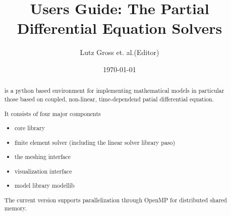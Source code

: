 \documentclass{manual}
\title{\esys Users Guide: The Partial Differential Equation Solvers}
\author{Lutz Gross et. al.(Editor)}
\date{\today}
\begin{document}
\maketitle



\begin{abstract}
\escript is a python based environment for implementing mathematical models in particular those based on coupled, non-linear, time-dependend patial differential equation.

It consists of four major components
\begin{itemize}
\item \escript core library
\item finite element solver \finley (including the linear solver library paso)
\item the meshing interface \pycad
\item visualization interface \pyvisi
\item model library modellib
\end{itemize}
The current version supports parallelization through OpenMP for distributed shared memory. 
\end{abstract}

\tableofcontents













% 


%

\makemodindex

\printindex
%



\end{document}
